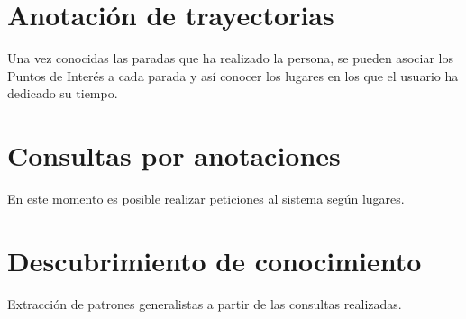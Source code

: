 \section{Anotación de trayectorias}

Una vez conocidas las paradas que ha realizado la persona, se pueden asociar los Puntos de Interés a cada parada y así conocer los lugares en los que el usuario ha dedicado su tiempo.

\section{Consultas por anotaciones}

En este momento es posible realizar peticiones al sistema según lugares.


\section{Descubrimiento de conocimiento}

Extracción de patrones generalistas  a partir de las consultas realizadas.